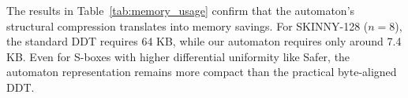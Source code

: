 The results in Table~\ref{tab:memory_usage} confirm that the automaton's structural compression translates into memory savings. For SKINNY-128 ($n=8$), the standard DDT requires 64 KB, while our automaton requires only around 7.4 KB. Even for S-boxes with higher differential uniformity like Safer, the automaton representation remains more compact than the practical byte-aligned DDT.